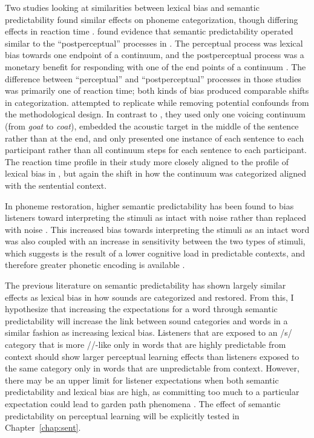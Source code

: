 Two studies looking at similarities between lexical bias and semantic predictability found similar effects on phoneme categorization, though differing effects in reaction time \citep{Connine1987,Borsky1998}.
\citet{Connine1987} found evidence that semantic predictability operated similar to the ``postperceptual'' processes in \citet{Connine1987a}.
The perceptual process was lexical bias towards one endpoint of a continuum, and the postperceptual process was a monetary benefit for responding with one of the end points of a continuum \citep{Connine1987a}.
The difference between ``perceptual'' and ``postperceptual'' processes in those studies was primarily one of reaction time; both kinds of bias produced comparable shifts in categorization.
\citet{Borsky1998} attempted to replicate \citet{Connine1987} while removing potential confounds from the methodological design.  
In contrast to \citet{Connine1987}, they used only one voicing continuum (from \emph{goat} to \emph{coat}), embedded the acoustic target in the middle of the sentence rather than at the end, and only presented one instance of each sentence to each participant rather than all continuum steps for each sentence to each participant.  
The reaction time profile in their study more closely aligned to the profile of lexical bias in \citet{Connine1987a}, but again the shift in how the continuum was categorized aligned with the sentential context.

In phoneme restoration, higher semantic predictability has been found to bias listeners toward interpreting the stimuli as intact with noise rather than replaced with noise \citep{Samuel1981}.
This increased bias towards interpreting the stimuli as an intact word was also coupled with an increase in sensitivity between the two types of stimuli, which \citet{Samuel1981} suggests is the result of a lower cognitive load in predictable contexts, and therefore greater phonetic encoding is available \citep[see also][]{Mattys2011}.

The previous literature on semantic predictability has shown largely similar effects as lexical bias in how sounds are categorized and restored.  
From this, I hypothesize that increasing the expectations for a word through semantic predictability will increase the link between sound categories and words in a similar fashion as increasing lexical bias.
Listeners that are exposed to an /s/ category that is more /\textesh/-like only in words that are highly predictable from context should show larger perceptual learning effects than listeners exposed to the same category only in words that are unpredictable from context.
However, there may be an upper limit for listener expectations when both semantic predictability and lexical bias are high, as committing too much to a particular expectation could lead to garden path phenomena \citep{Levy2008}.
The effect of semantic predictability on perceptual learning will be explicitly tested in Chapter~\ref{chap:sent}.

